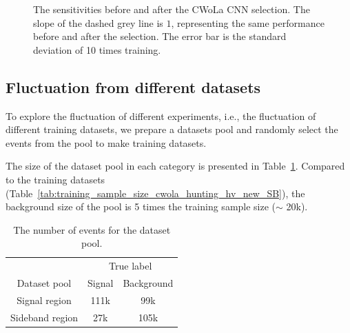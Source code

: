 \documentclass[12pt]{article}
\begin{document}
		\begin{figure}[htpb]
			\centering
			\caption{The sensitivities before and after the CWoLa CNN selection. The slope of the dashed grey line is $1$, representing the same performance before and after the selection. The error bar is the standard deviation of 10 times training.}
			\label{fig:sensitivity_improvement_pt_jet_aug_3_ZN}
		\end{figure}
	\subsection{Fluctuation from different datasets}%
	\label{sub:fluctuation_from_different_datasets}
		To explore the fluctuation of different experiments, i.e., the fluctuation of different training datasets, we prepare a datasets pool and randomly select the events from the pool to make training datasets. 

		The size of the dataset pool in each category is presented in Table~\ref{tab:dataset_pool_sample_size}. Compared to the training datasets (Table~\ref{tab:training_sample_size_cwola_hunting_hv_new_SB}), the background size of the pool is 5 times the training sample size ($\sim$ 20k). 
		\begin{table}[htpb]
			\centering
			\caption{The number of events for the dataset pool.}
			\label{tab:dataset_pool_sample_size}
			\begin{tabular}{c|cc}
								& \multicolumn{2}{c}{True label} \\
				Dataset pool    & Signal       & Background      \\ \hline
				Signal region   & 111k         & 99k             \\
				Sideband region & 27k          & 105k
			\end{tabular}
		\end{table}
\end{document}
